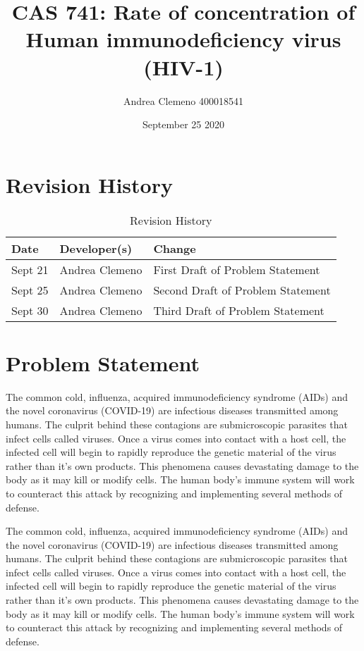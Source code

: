 \documentclass{article}
\title{CAS 741: Rate of concentration of Human immunodeficiency virus (HIV-1)}
\author{Andrea Clemeno  400018541}
\date{September 25 2020}
\begin{document}
\maketitle
\newpage
\section{Revision History}

\begin{table}[hp]
\caption{Revision History} \label{TblRevisionHistory}
\begin{tabularx}{\textwidth}{llX}
\toprule
\textbf{Date} & \textbf{Developer(s)} & \textbf{Change}\\
\midrule
Sept 21 & Andrea Clemeno & First Draft of Problem Statement\\
Sept 25 & Andrea Clemeno & Second Draft of Problem Statement\\
Sept 30 & Andrea Clemeno & Third Draft of Problem Statement\\


\bottomrule
\end{tabularx}
\end{table}


\newpage
\section{Problem Statement}

The common cold, influenza, acquired immunodeficiency syndrome (AIDs) and the 
novel coronavirus (COVID-19) are infectious diseases transmitted among humans. 
The culprit behind these contagions are submicroscopic parasites that infect 
cells called viruses. Once a virus comes into contact with a host cell, the 
infected cell will begin to rapidly reproduce the genetic material of the virus 
rather than it’s own products. This phenomena causes devastating damage to the 
body as it may kill or modify cells. The human body’s immune system will work to 
counteract this attack by recognizing and implementing several methods of 
defense. 

The common cold, influenza, acquired immunodeficiency syndrome (AIDs) and the 
novel coronavirus (COVID-19) are infectious diseases transmitted among humans. 
The culprit behind these contagions are submicroscopic parasites that infect 
cells called viruses. Once a virus comes into contact with a host cell, the 
infected cell will begin to rapidly reproduce the genetic material of the virus 
rather than it’s own products. This phenomena causes devastating damage to the 
body as it may kill or modify cells. The human body’s immune system will work to 
counteract this attack by recognizing and implementing several methods of 
defense. 
\end{document}
